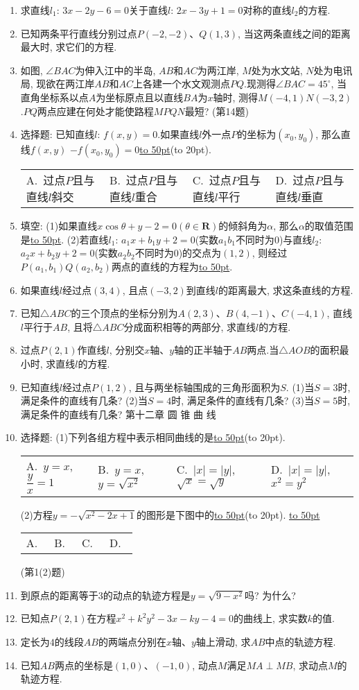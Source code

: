 \documentclass[10pt,a4paper]{article}
\newcommand{\blank}[1]{\underline{\hbox to #1pt{}}}
\newcommand{\bracket}[1]{(\hbox to #1pt{})}
\newcommand{\fourch}[4]{\par\begin{tabular}{p{.23\textwidth}p{.23\textwidth}p{.23\textwidth}p{.23\textwidth}}
A.~#1 &B.~#2& C.~#3& D.~#4
\end{tabular}}
\begin{document}
\begin{enumerate}[1.]
\item 求直线$l_1$: $3x-2y-6=0$关于直线$l$: $2x-3y+1=0$对称的直线$l_2$的方程.
\item 已知两条平行直线分别过点$P(-2,-2)$、$Q(1,3)$, 当这两条直线之间的距离最大时, 求它们的方程.
\item 如图, $\angle BAC$为伸入江中的半岛, $AB$和$AC$为两江岸, $M$处为水文站, $N$处为电讯局, 现欲在两江岸$AB$和$AC$上各建一个水文观测点$PQ$.现测得$\angle BAC=45^{\circ }$, 当直角坐标系以点$A$为坐标原点且以直线$BA$为$x$轴时, 测得$M(-4,1)N(-3,2)$.$PQ$两点应建在何处才能使路程$MPQN$最短?
(第14题)
\item 选择题:
已知直线$l$: $f(x,y)=0$.如果直线$l$外一点$P$的坐标为$(x_0,y_0)$, 那么直线$f(x,y)$ $-f(x_0,y_0)=0$\blank{50}\bracket{20}.
\fourch{过点$P$且与直线$l$斜交}{过点$P$且与直线$l$重合}{过点$P$且与直线$l$平行}{过点$P$且与直线$l$垂直}
\item 填空:
(1)如果直线$x\cos \theta +y-2=0(\theta \in \mathbf{R})$的倾斜角为$\alpha$, 那么$\alpha$的取值范围是\blank{50}.
(2)若直线$l_1$: $a_1x+b_1y+2=0$(实数$a_1b_1$不同时为$0$)与直线$l_2$: $a_2x+b_2y+2=0$(实数$a_2b_2$不同时为$0$)的交点为$(1,2)$, 则经过$P(a_1,b_1)Q(a_2,b_2)$两点的直线的方程为\blank{50}.
\item 如果直线$l$经过点$(3,4)$, 且点$(-3,2)$到直线$l$的距离最大, 求这条直线的方程.
\item 已知$\triangle ABC$的三个顶点的坐标分别为$A(2,3)$、$B(4,-1)$、$C(-4,1)$, 直线$l$平行于$AB$, 且将$\triangle ABC$分成面积相等的两部分, 求直线$l$的方程.
\item 过点$P(2,1)$作直线$l$, 分别交$x$轴、$y$轴的正半轴于$AB$两点.当$\triangle AOB$的面积最小时, 求直线$l$的方程.
\item 已知直线$l$经过点$P(1,2)$, 且与两坐标轴围成的三角形面积为$S$.
(1)当$S=3$时, 满足条件的直线有几条?
(2)当$S=4$时, 满足条件的直线有几条?
(3)当$S=5$时, 满足条件的直线有几条?
第十二章  圆 锥 曲 线
\item 选择题:
(1)下列各组方程中表示相同曲线的是\blank{50}\bracket{20}.
\fourch{$y=x$, $\dfrac yx=1$}{$y=x$, $y=\sqrt {x^{2}}$}{$|x|=|y|$, $\sqrt x=\sqrt y$}{$|x|=|y|$, $x^2=y^2$}
(2)方程$y=-\sqrt {x^2-2x+1}$的图形是下图中的\blank{50}\bracket{20}.
\blank{50}\fourch{}{}{}{}
(第1(2)题)
\item 到原点的距离等于$3$的动点的轨迹方程是$y=\sqrt {9-x^2}$吗? 为什么?
\item 已知点$P(2,1)$在方程$x^2+k^2y^2-3x-ky-4=0$的曲线上, 求实数$k$的值.
\item 定长为$4$的线段$AB$的两端点分别在$x$轴、$y$轴上滑动, 求$AB$中点的轨迹方程.
\item 已知$AB$两点的坐标是$(1,0)$、$(-1,0)$, 动点$M$满足$MA\perp MB$, 求动点$M$的轨迹方程.

\end{enumerate}
\end{document}
